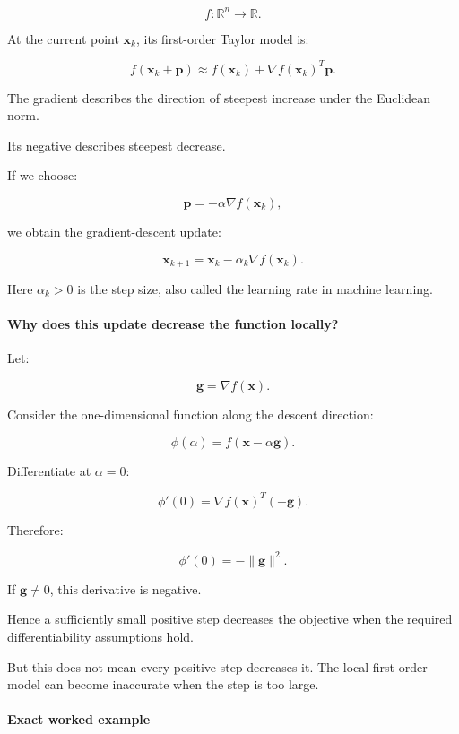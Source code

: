\[
f:\mathbb R^n\to\mathbb R.
\]

At the current point \(\mathbf x_k\), its first-order Taylor model is:

\[
f(\mathbf x_k+\mathbf p) \approx f(\mathbf x_k)+\nabla f(\mathbf x_k)^T\mathbf p.
\]

The gradient describes the direction of steepest increase under the Euclidean norm.

Its negative describes steepest decrease.

If we choose:

\[
\mathbf p=-\alpha\nabla f(\mathbf x_k),
\]

we obtain the gradient-descent update:

\[
\boxed{ \mathbf x_{k+1} = \mathbf x_k-\alpha_k\nabla f(\mathbf x_k) }.
\]

Here \(\alpha_k>0\) is the step size, also called the learning rate in machine learning.

\paragraph{Why does this update decrease the function locally?}\label{02-foundations-ii-ch026-why-does-this-update-decrease-the-function-locally}

\hypertarget{02-foundations-ii-ch026-why-does-this-update-decrease-the-function-locally}{}

Let:

\[
\mathbf g=\nabla f(\mathbf x).
\]

Consider the one-dimensional function along the descent direction:

\[
\phi(\alpha)=f(\mathbf x-\alpha\mathbf g).
\]

Differentiate at \(\alpha=0\):

\[
\phi'(0)= \nabla f(\mathbf x)^T(-\mathbf g).
\]

Therefore:

\[
\boxed{ \phi'(0)=-\|\mathbf g\|^2 }.
\]

If \(\mathbf g\ne0\), this derivative is negative.

Hence a sufficiently small positive step decreases the objective when the required differentiability assumptions hold.

But this does not mean every positive step decreases it. The local first-order model can become inaccurate when the step is too large.

\paragraph{Exact worked example}\label{02-foundations-ii-ch026-exact-worked-example}

